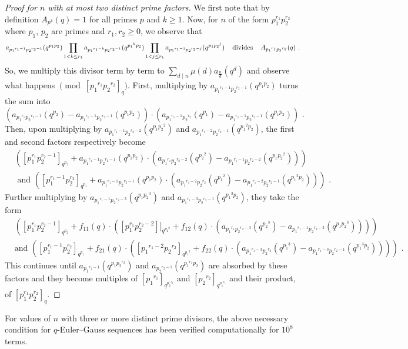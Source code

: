 \documentclass{article}
\numberwithin{equation}{section}
\theoremstyle{definition}
\begin{document}
\begin{proof}[Proof for $n$ with at most two distinct prime factors]
    We first note that by definition $A_{p^k}(q)=1$ for all primes $p$ and $k\geq1$. 
    Now, for $n$ of the form $p_1^{r_1}p_2^{r_2}$ where $p_1$, $p_2$ are primes and $r_1,r_2\geq0$, we observe that 
    \[a_{{p_1}^{r_1-1}{p_2}^{r_2-1}}(q^{p_1p_2})\prod_{1<k\leq r_1}a_{{p_1}^{r_1-k}{p_2}^{r_2-1}}(q^{{p_1}^kp_2})\prod_{1<j\leq r_1}a_{{p_1}^{r_1-1}{p_2}^{r_2-j}}(q^{p_1{p_2}^j})\text{\hspace{4mm}divides\hspace{4mm}}A_{{p_1}^{r_1}{p_2}^{r_2}}(q)\text{ .}\]
    So, we multiply this divisor term by term to $\sum_{d\mid n} \mu(d)a_{\frac{n}{d}}(q^d)$ and observe what happens $\pmod{[{p_1}^{r_1}{p_2}^{r_2}]_q}$. First, multiplying by $a_{{p_1}^{r_1-1}{p_2}^{r_2-1}}(q^{p_1p_2})$ turns the sum into \[(a_{{p_1}^{r_1}{p_2}^{r_2-1}}(q^{p_2})-a_{{p_1}^{r_1-1}{p_2}^{r_2-1}}(q^{p_1p_2}))\cdot(a_{{p_1}^{r_1-1}{p_2}^{r_2}}(q^{p_1})-a_{{p_1}^{r_1-1}{p_2}^{r_2-1}}(q^{p_1p_2}))\text{ .}\] Then, upon multiplying by $a_{{p_1}^{r_1-1}{p_2}^{r_2-2}}(q^{p_1{p_2}^2})$ and $a_{{p_1}^{r_1-2}{p_2}^{r_2-1}}(q^{{p_1}^2p_2})$, the first and second factors respectively become
    \begin{align*}
        &([p_1^{r_1}p_2^{r_2-1}]_{q^{p_2}}+a_{{p_1}^{r_1-1}{p_2}^{r_2-1}}(q^{p_1p_2})\cdot(a_{{p_1}^{r_1}{p_2}^{r_2-2}}(q^{{p_2}^2})-a_{{p_1}^{r_1-1}{p_2}^{r_2-2}}(q^{p_1{p_2}^2})))\\ &\text{ and } 
        ([p_1^{r_1-1}p_2^{r_2}]_{q^{p_1}}+a_{{p_1}^{r_1-1}{p_2}^{r_2-1}}(q^{p_1p_2})\cdot(a_{{p_1}^{r_1-2}{p_2}^{r_2}}(q^{{p_1}^2})-a_{{p_1}^{r_1-2}{p_2}^{r_2-1}}(q^{{p_1}^2p_2})))\text{ .}
    \end{align*} 
    Further multiplying by $a_{{p_1}^{r_1-1}{p_2}^{r_2-3}}(q^{p_1{p_2}^3})$ and $a_{{p_1}^{r_1-3}{p_2}^{r_2-1}}(q^{{p_1}^3p_2})$, they take the form 
    \begin{align*}
        &([p_1^{r_1}p_2^{r_2-1}]_{q^{p_2}}+f_{11}(q)\cdot([p_1^{r_1}p_2^{r_2-2}]]_{q^{{p_2}^2}}+f_{12}(q)\cdot(a_{{p_1}^{r_1}{p_2}^{r_2-3}}(q^{{p_2}^3})-a_{{p_1}^{r_1-1}{p_2}^{r_2-3}}(q^{p_1{p_2}^3}))))\\ &\text{and }([p_1^{r_1-1}p_2^{r_2}]_{q^{p_1}}+f_{21}(q)\cdot([{p_1}^{r_1-2}{p_2}^{r_2}]_{q^{{p_1}^2}}+f_{22}(q)\cdot(a_{{p_1}^{r_1-3}{p_2}^{r_2}}(q^{{p_1}^3})-a_{{p_1}^{r_1-3}{p_2}^{r_2-1}}(q^{{p_1}^3p_2}))))\text{ .}
    \end{align*}
    This continues until $a_{{p_1}^{r_1-1}}(q^{p_1{p_2}^{r_2}})$ and $a_{{p_2}^{r_2-1}}(q^{{p_1}^{r_1}p_2})$ are absorbed by these factors and they become multiples of $[{p_1}^{r_1}]_{q^{{p_2}^{r_2}}}$ and $[{p_2}^{r_2}]_{q^{{p_1}^{r_1}}}$ and their product, of $[p_1^{r_1}p_2^{r_2}]_q$.

\end{proof}
For values of $n$ with three or more distinct prime divisors, the above necessary condition for $q$-Euler--Gauss sequences has been verified computationally for $10^8$ terms.  
\end{document}
